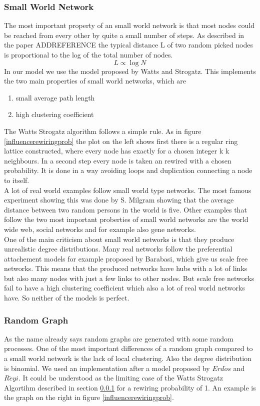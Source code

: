 \subsubsection{Small World Network}
\label{subsubsec:smallworld}
The most important property of an small world network is that most nodes could be reached from every other by quite a small number of steps. As described in the paper ADDREFERENCE the typical distance L of two random picked nodes is proportional to the log of the total number of nodes.
\begin{equation}
L \propto \log N
\end{equation}
In our model we use the model proposed by Watts and Strogatz. This implements the two main properties of small world networks, which are
\begin{enumerate}
\item small average path length
\item high clustering coefficient
\end{enumerate}
The Watts Strogatz algorithm follows a simple rule. As in figure \ref{influencerewiringprob} the plot on the left shows first there is a regular ring lattice constructed, where every node has exactly for a chosen integer k k neighbours. In a second step every node is taken an rewired with a chosen probability. It is done in a way avoiding loops and duplication \ie connecting a node to itself.\\
A lot of real world examples follow small world type networks. The most famous experiment showing this was done by S. Milgram showing that the average distance between two random persons in the world is five. Other examples that follow the two most important proberties of small world networks are the world wide web, social networks and for example also gene networks. \\
One of the main criticism about small world networks is that they produce unrealistic degree distributions. Many real networks follow the preferential attachement models for example proposed by Barabasi, which give us scale free networks. This means that the produced networks have hubs with a lot of links but also many nodes with just a few links to other nodes. But scale free networks fail to have a high clustering coefficient which also a lot of real world networks have. So neither of the models is perfect.

\subsubsection{Random Graph}
\label{subsubsec:randomgraph}
As the name already says random graphs are generated with some random processes. One of the most important differences of a random graph compared to a small world network is the lack of local clustering. Also the degree distribution is binomial. We used an implementation after a model proposed by $Erd\acute{o}s$ and $R\acute{e}yi$. It could be understood as the limiting case of the Watts Strogatz Algortihm described in section \ref{subsubsec:smallworld} for a rewiring probability of 1. An example is the graph on the right in figure \ref{influencerewiringprob}.